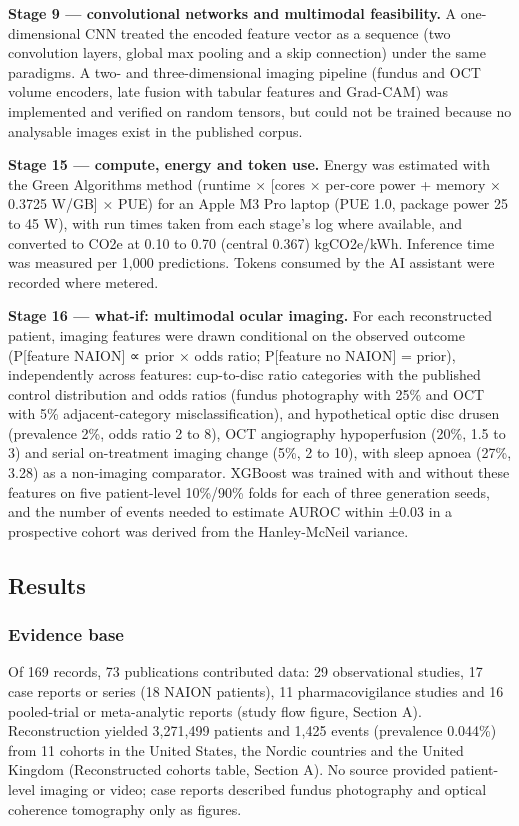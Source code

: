 \documentclass[
  11pt,
]{article}
\begin{document}
\textbf{Stage 9 --- convolutional networks and multimodal feasibility.}
A one-dimensional CNN treated the encoded feature vector as a sequence
(two convolution layers, global max pooling and a skip connection) under
the same paradigms. A two- and three-dimensional imaging pipeline
(fundus and OCT volume encoders, late fusion with tabular features and
Grad-CAM) was implemented and verified on random tensors, but could not
be trained because no analysable images exist in the published corpus.

\textbf{Stage 15 --- compute, energy and token use.} Energy was
estimated with the Green Algorithms method (runtime × {[}cores ×
per-core power + memory × 0.3725 W/GB{]} × PUE) for an Apple M3 Pro
laptop (PUE 1.0, package power 25 to 45 W), with run times taken from
each stage's log where available, and converted to CO2e at 0.10 to 0.70
(central 0.367) kgCO2e/kWh. Inference time was measured per 1,000
predictions. Tokens consumed by the AI assistant were recorded where
metered.

\textbf{Stage 16 --- what-if: multimodal ocular imaging.} For each
reconstructed patient, imaging features were drawn conditional on the
observed outcome (P{[}feature \textbar{} NAION{]} ∝ prior × odds ratio;
P{[}feature \textbar{} no NAION{]} = prior), independently across
features: cup-to-disc ratio categories with the published control
distribution and odds ratios (fundus photography with 25\% and OCT with
5\% adjacent-category misclassification), and hypothetical optic disc
drusen (prevalence 2\%, odds ratio 2 to 8), OCT angiography
hypoperfusion (20\%, 1.5 to 3) and serial on-treatment imaging change
(5\%, 2 to 10), with sleep apnoea (27\%, 3.28) as a non-imaging
comparator. XGBoost was trained with and without these features on five
patient-level 10\%/90\% folds for each of three generation seeds, and
the number of events needed to estimate AUROC within ±0.03 in a
prospective cohort was derived from the Hanley-McNeil variance.

\subsection{Results}\label{results}

\subsubsection{Evidence base}\label{evidence-base}

Of 169 records, 73 publications contributed data: 29 observational
studies, 17 case reports or series (18 NAION patients), 11
pharmacovigilance studies and 16 pooled-trial or meta-analytic reports
(study flow figure, Section A). Reconstruction yielded 3,271,499
patients and 1,425 events (prevalence 0.044\%) from 11 cohorts in the
United States, the Nordic countries and the United Kingdom
(Reconstructed cohorts table, Section A). No source provided
patient-level imaging or video; case reports described fundus
photography and optical coherence tomography only as figures.
\end{document}
